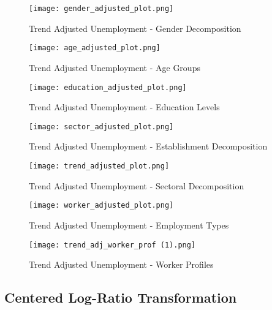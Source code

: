 \documentclass[a4paper,12pt]{article}
\begin{document}
\begin{figure} [H]
        \centering
        \texttt{[image: gender\_adjusted\_plot.png]}
        \caption{Trend Adjusted Unemployment - Gender Decomposition}
        \label{fig:trend_adj_gender}
\end{figure}

\begin{figure} [H]
        \centering
        \texttt{[image: age\_adjusted\_plot.png]}
        \caption{Trend Adjusted Unemployment - Age Groups}
        \label{fig:trend_adj_age}
\end{figure}

    \begin{figure} [H]
            \centering
            \texttt{[image: education\_adjusted\_plot.png]}
            \caption{Trend Adjusted Unemployment - Education Levels}
            \label{fig:trend_adj_educ}
    \end{figure}

    \begin{figure} [H]
        \centering
        \texttt{[image: sector\_adjusted\_plot.png]}
        \caption{Trend Adjusted Unemployment - Establishment Decomposition}
        \label{fig:trend_adj_pubpriv}
    \end{figure}

    \begin{figure} [H]
        \centering
        \texttt{[image: trend\_adjusted\_plot.png]}
        \caption{Trend Adjusted Unemployment - Sectoral Decomposition}
        \label{fig:trend_adj_threesectors}
    \end{figure}

    \begin{figure} [H]
        \centering
        \texttt{[image: worker\_adjusted\_plot.png]}
        \caption{Trend Adjusted Unemployment - Employment Types}
        \label{fig:trend_adj_employment}
    \end{figure}

    \begin{figure} [H]
        \centering
        \texttt{[image: trend\_adj\_worker\_prof (1).png]}
        \caption{Trend Adjusted Unemployment - Worker Profiles}
        \label{fig:trend_adj_worker_prof}
    \end{figure}

    



\subsection{Centered Log-Ratio Transformation} \label{appendix:clr_math}
\end{document}
